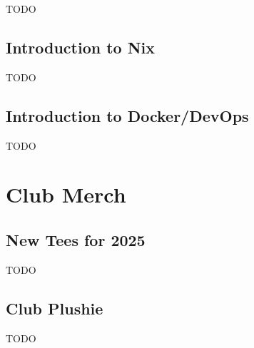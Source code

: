 \documentclass[11pt,fleqn]{article}
\begin{document}
TODO

\subsection{Introduction to Nix}

TODO

\subsection{Introduction to Docker/DevOps}

TODO

\newpage

\section{Club Merch}

\subsection{New Tees for 2025}

TODO

\subsection{Club Plushie}

TODO
\end{document}
